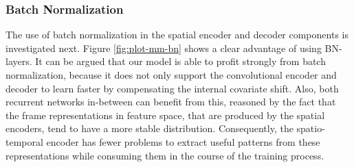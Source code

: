 \subsubsection*{Batch Normalization}

The use of batch normalization in the spatial encoder and decoder components is investigated next. Figure \ref{fig:plot-mm-bn} shows a clear advantage of using BN-layers. It can be argued that our model is able to profit strongly from batch normalization, because it does not only support the convolutional encoder and decoder to learn faster by compensating the internal covariate shift. Also, both recurrent networks in-between can benefit from this, reasoned by the fact that the frame representations in feature space, that are produced by the spatial encoders, tend to have a more stable distribution. Consequently, the spatio-temporal encoder has fewer problems to extract useful patterns from these representations while consuming them in the course of the training process.

